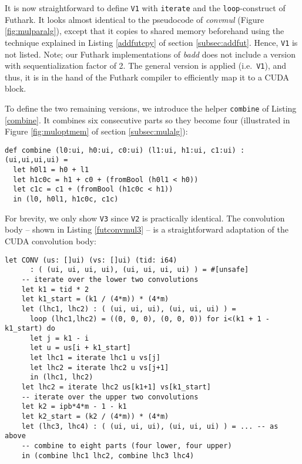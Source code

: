 It is now straightforward to define \texttt{V1} with \texttt{iterate} and the
\texttt{loop}-construct of Futhark. It looks almost identical to the pseudocode
of \textit{convmul} (Figure \ref{fig:mulparalg}), except that it copies to
shared memory beforehand using the technique explained in Listing
\ref{addfutcpy} of section \ref{subsec:addfut}. Hence, \texttt{V1} is not
listed. Note; our Futhark implementations of \textit{badd} does not include a
version with sequentialization factor of 2. The general version is applied
(i.e.\ \texttt{V1}), and thus, it is in the hand of the Futhark compiler to
efficiently map it to a CUDA block.

To define the two remaining versions, we introduce the helper \texttt{combine}
of Listing \ref{combine}. It combines six consecutive parts so they become four
(illustrated in Figure \ref{fig:muloptmem} of section \ref{subsec:mulalg}):
\begin{lstlisting}[language=futhark,caption={\footnotesize Futhark function to combine the parts of two consecutive convolutions from file \texttt{mul.fut}.},label={combine},firstnumber=26]
def combine (l0:ui, h0:ui, c0:ui) (l1:ui, h1:ui, c1:ui) : (ui,ui,ui,ui) =
  let h0l1 = h0 + l1
  let h1c0c = h1 + c0 + (fromBool (h0l1 < h0))
  let c1c = c1 + (fromBool (h1c0c < h1))
  in (l0, h0l1, h1c0c, c1c)
\end{lstlisting}

For brevity, we only show \texttt{V3} since \texttt{V2} is practically
identical. The convolution body -- shown in Listing \ref{futconvmul3} -- is a
straightforward adaptation of the CUDA convolution body:

\begin{lstlisting}[language=futhark,caption={\footnotesize Futhark \textit{convmul} \texttt{V3} convolution function on thread-basis in from file \texttt{mul.fut} (slightly edited).},label={futconvmul3},gobble=2,firstnumber=154]
  let CONV (us: []ui) (vs: []ui) (tid: i64)
      : ( (ui, ui, ui, ui), (ui, ui, ui, ui) ) = #[unsafe]
    -- iterate over the lower two convolutions
    let k1 = tid * 2
    let k1_start = (k1 / (4*m)) * (4*m)
    let (lhc1, lhc2) : ( (ui, ui, ui), (ui, ui, ui) ) =
      loop (lhc1,lhc2) = ((0, 0, 0), (0, 0, 0)) for i<(k1 + 1 - k1_start) do
      let j = k1 - i
      let u = us[i + k1_start]
      let lhc1 = iterate lhc1 u vs[j]
      let lhc2 = iterate lhc2 u vs[j+1]
      in (lhc1, lhc2)
    let lhc2 = iterate lhc2 us[k1+1] vs[k1_start]
    -- iterate over the upper two convolutions
    let k2 = ipb*4*m - 1 - k1
    let k2_start = (k2 / (4*m)) * (4*m)
    let (lhc3, lhc4) : ( (ui, ui, ui), (ui, ui, ui) ) = ... -- as above
    -- combine to eight parts (four lower, four upper)
    in (combine lhc1 lhc2, combine lhc3 lhc4)
\end{lstlisting}

